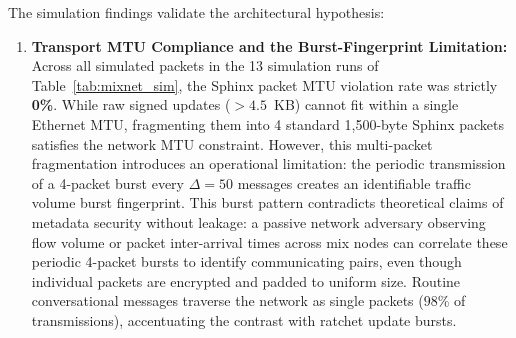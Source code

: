 \documentclass[11pt,a4paper]{article}
\theoremstyle{remark}
\theoremstyle{plain}
\begin{document}
The simulation findings validate the architectural hypothesis:
\begin{enumerate}
  \item \textbf{Transport MTU Compliance and the Burst-Fingerprint Limitation:} Across all simulated packets in the 13 simulation runs of Table~\ref{tab:mixnet_sim}, the Sphinx
        packet MTU violation rate was strictly \textbf{0\%}.  While raw signed updates ($> 4.5$~KB) cannot fit
        within a single Ethernet MTU, fragmenting them into 4 standard 1{,}500-byte Sphinx packets satisfies the
        network MTU constraint.  However, this multi-packet fragmentation introduces an operational limitation:
        the periodic transmission of a 4-packet burst every $\Delta = 50$ messages creates an identifiable traffic volume burst fingerprint.
        This burst pattern contradicts theoretical claims of metadata security without leakage: a passive network adversary observing flow volume or packet inter-arrival times across mix nodes can correlate these periodic 4-packet bursts to identify communicating pairs, even though individual packets are encrypted and padded to uniform size.
        Routine conversational messages traverse the network as single packets ($98\%$ of transmissions), accentuating the contrast with ratchet update bursts.


\end{enumerate}
\end{document}
